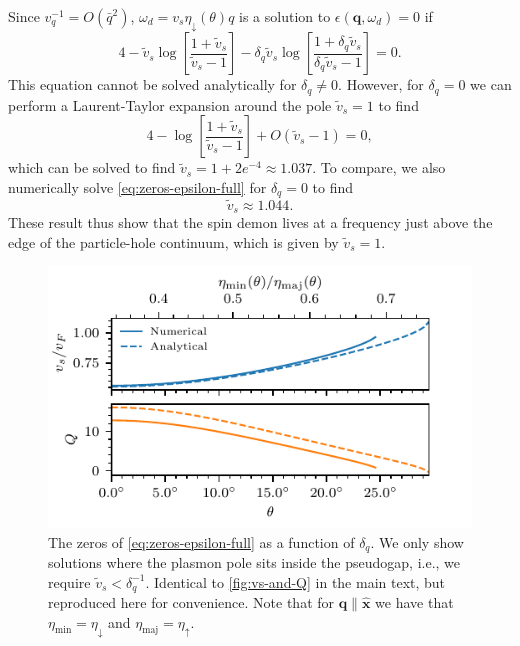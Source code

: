 \documentclass[aps,prb,reprint,twocolumns,superscriptaddress,nofootinbib]{revtex4-2}
\newcommand{\xx}{\hat{\bm{x}}}
\begin{document}
	Since $v_q^{-1}=O(\bar q^2)$, $\omega_d=v_s\eta_\downarrow(\theta) q$ is a solution to $\epsilon(\bm q,\omega_d)=0$ if
	\begin{equation}
		4-\tilde v_s\log \left[ \frac{1+\tilde v_s}{\tilde v_s-1}\right] - \delta_q \tilde v_s \log \left[ \frac{1+\delta_q\tilde v_s}{\delta_q\tilde v_s-1}\right] = 0. \label{eq:zeros-epsilon-full}
	\end{equation} 
	This equation cannot be solved analytically for $\delta_q\neq0$. However, for $\delta_q=0$ we can perform a Laurent-Taylor expansion around the pole $\tilde v_s=1$ to find 
	\begin{equation}
		4-\log \left[ \frac{1+\tilde v_s}{\tilde v_s-1}\right] + O(\tilde v_s - 1) = 0,
	\end{equation}
	which can be solved to find $\tilde v_s=1+2e^{-4}\approx1.037$. To compare, we also numerically solve \cref{eq:zeros-epsilon-full} for $\delta_q=0$ to find
	\begin{equation}
		\tilde v_s \approx 1.044.
	\end{equation}
	These result thus show that the spin demon lives at a frequency just above the edge of the particle-hole continuum, which is given by $\tilde v_s=1$.   
	
	\begin{figure}
		\includegraphics{angles_vs_and_Q_with_eta}
		\caption{The zeros of \cref{eq:zeros-epsilon-full} as a function of $\delta_q$. We only show solutions where the plasmon pole sits inside the pseudogap, i.e., we require $\tilde v_s<\delta_q^{-1}$. Identical to \cref{fig:vs-and-Q} in the main text, but reproduced here for convenience. Note that for $\bm q\parallel\xx$ we have that $\eta_{\mathrm{min}}=\eta_{\downarrow}$ and $\eta_{\mathrm{maj}}=\eta_{\uparrow}$. \label{fig:vs-poles}}
	\end{figure}
	
\end{document}
